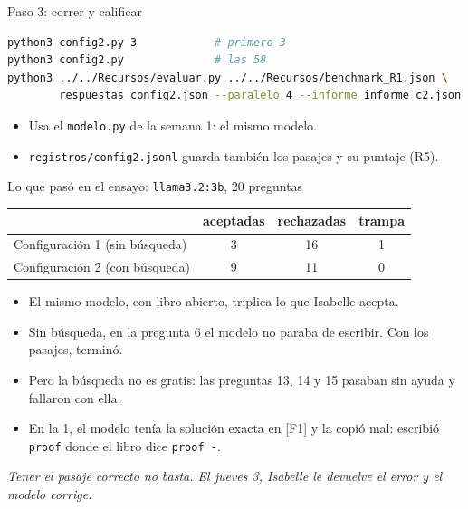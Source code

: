\documentclass[10pt]{beamer}
\newcommand{\nota}[1]{{\small\itshape\color{psCom} #1}}
\newcommand{\cd}[1]{\texttt{#1}}
\begin{document}
\begin{frame}[fragile]{Paso 3: correr y calificar}
\begin{lstlisting}[language=bash]
python3 config2.py 3            # primero 3
python3 config2.py              # las 58
python3 ../../Recursos/evaluar.py ../../Recursos/benchmark_R1.json \
        respuestas_config2.json --paralelo 4 --informe informe_c2.json
\end{lstlisting}
  \begin{itemize}
    \item Usa el \cd{modelo.py} de la semana 1: el mismo modelo.
    \item \cd{registros/config2.jsonl} guarda también los pasajes y su
      puntaje (R5).
  \end{itemize}
\end{frame}


\begin{frame}{Lo que pasó en el ensayo: \texttt{llama3.2:3b}, 20 preguntas}
  \begin{center}
  \begin{tabular}{@{}lccc@{}}
    \toprule
    & aceptadas & rechazadas & trampa \\
    \midrule
    Configuración 1 (sin búsqueda) & 3 & 16 & 1 \\
    \alert{Configuración 2 (con búsqueda)} & \alert{9} & \alert{11} & \alert{0} \\
    \bottomrule
  \end{tabular}
  \end{center}
  \begin{itemize}
    \item El mismo modelo, con libro abierto, \alert{triplica} lo que Isabelle acepta.
    \item Sin búsqueda, en la pregunta 6 el modelo no paraba de escribir.
      Con los pasajes, terminó.
    \item Pero la búsqueda no es gratis: las preguntas 13, 14 y 15 pasaban
      sin ayuda y \alert{fallaron} con ella.
    \item En la 1, el modelo tenía la solución exacta en [F1] y la copió mal:
      escribió \cd{proof} donde el libro dice \cd{proof -}.
  \end{itemize}
  \nota{Tener el pasaje correcto no basta. El jueves 3, Isabelle le devuelve
  el error y el modelo corrige.}
\end{frame}
\end{document}
